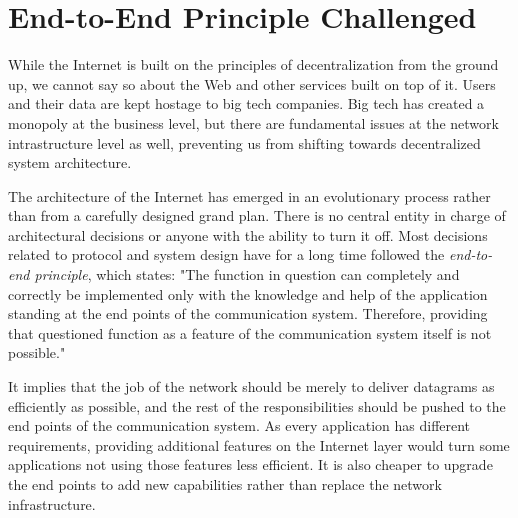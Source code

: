 

\section{End-to-End Principle Challenged}

While the Internet is built on the principles of decentralization from the ground up, we cannot say so about the Web and other services built on top of it. Users and their data are kept hostage to big tech companies. Big tech has created a monopoly at the business level, but there are fundamental issues at the network intrastructure level as well, preventing us from shifting towards decentralized system architecture.

The architecture of the Internet has emerged in an evolutionary process rather than from a carefully designed grand plan. There is no central entity in charge of architectural decisions or anyone with the ability to turn it off. Most decisions related to protocol and system design have for a long time followed the \textit{end-to-end principle}, which states: "The function in question can completely and correctly be implemented only with the knowledge and help of the application standing at the end points of the communication system. Therefore, providing that questioned function as a feature of the communication system itself is not possible." \cite{endtoend}

It implies that the job of the network should be merely to deliver datagrams as efficiently as possible, and the rest of the responsibilities should be pushed to the end points of the communication system. As every application has different requirements, providing additional features on the Internet layer would turn some applications not using those features less efficient. It is also cheaper to upgrade the end points to add new capabilities rather than replace the network infrastructure.


